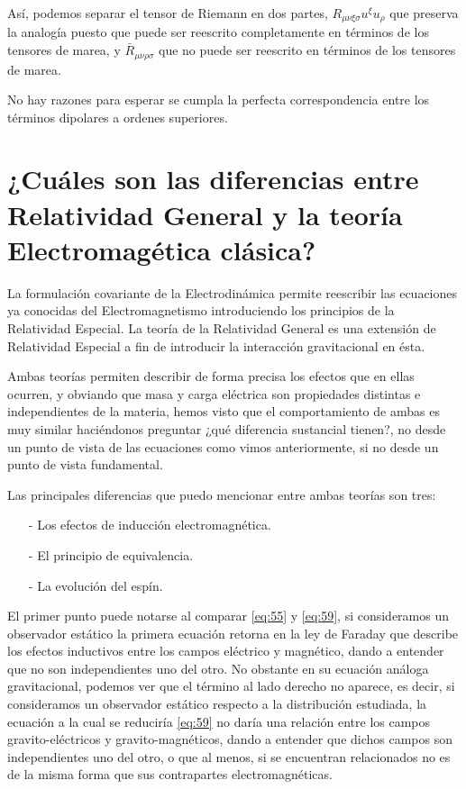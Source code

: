 Así, podemos separar el tensor de Riemann en dos partes, $R_{\mu \nu \xi \sigma} u^{\xi} u_{\rho}$ que preserva la analogía puesto que puede ser reescrito completamente en términos de los tensores de marea, y $\bar{R}_{\mu \nu \rho \sigma}$ que no puede ser reescrito en términos de los tensores de marea.

No hay razones para esperar se cumpla la perfecta correspondencia entre los términos dipolares a ordenes superiores.

\section{¿Cuáles son las diferencias entre Relatividad General y la teoría Electromagética clásica?}

La formulación covariante de la Electrodinámica permite reescribir las ecuaciones ya conocidas del Electromagnetismo introduciendo los principios de la Relatividad Especial. La teoría de la Relatividad General es una extensión de Relatividad Especial a fin de introducir la interacción gravitacional en ésta.

Ambas teorías permiten describir de forma precisa los efectos que en ellas ocurren, y obviando que masa y carga eléctrica son propiedades distintas e independientes de la materia, hemos visto que el comportamiento de ambas es muy similar haciéndonos preguntar ¿qué diferencia sustancial tienen?, no desde un punto de vista de las ecuaciones como vimos anteriormente, si no desde un punto de vista fundamental.

Las principales diferencias que puedo mencionar entre ambas teorías son tres:
\begin{itemize}
\item[-] Los efectos de inducción electromagnética.
\item[-] El principio de equivalencia.
\item[-] La evolución del espín.
\end{itemize}

El primer punto puede notarse al comparar \eqref{eq:55} y \eqref{eq:59}, si consideramos un observador estático la primera ecuación retorna en la ley de Faraday que describe los efectos inductivos entre los campos eléctrico y magnético, dando a entender que no son independientes uno del otro. No obstante en su ecuación análoga gravitacional, podemos ver que el término al lado derecho no aparece, es decir, si consideramos un observador estático respecto a la distribución estudiada, la ecuación a la cual se reduciría \eqref{eq:59} no daría una relación entre los campos gravito-eléctricos y gravito-magnéticos, dando a entender que dichos campos son independientes uno del otro, o que al menos, si se encuentran relacionados no es de la misma forma que sus contrapartes electromagnéticas.

